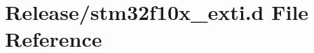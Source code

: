 \hypertarget{stm32f10x__exti_8d}{}\section{Release/stm32f10x\+\_\+exti.d File Reference}
\label{stm32f10x__exti_8d}
